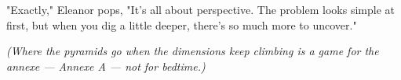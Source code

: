 "Exactly," Eleanor pops, "It’s all about perspective. The problem looks simple at first, but when you dig a little deeper, there’s so much more to uncover."

\textit{(Where the pyramids go when the dimensions keep climbing is a game for the annexe --- Annexe A --- not for bedtime.)}

% 
% 
% 
% 
% 
